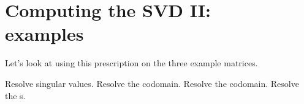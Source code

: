 \chapter[Computing the SVD II]{Computing the SVD II:\\examples}

Let's look at using this prescription on the three example matrices. 

Resolve singular values. Resolve the codomain. Resolve the codomain. Resolve the \ns s.






\endinput
